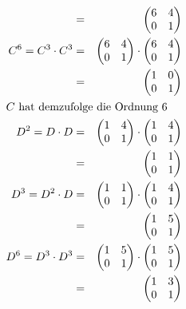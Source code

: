 \documentclass[10pt,a4paper,oneside,ngerman,numbers=noenddot]{scrartcl}
\begin{document}
\begin{alignat*}{2}
&=& \begin{pmatrix} 6 & 4 \\ 0 & 1 \end{pmatrix} \\
C^{6} = C^{3} \cdot C^{3} &=& \begin{pmatrix} 6 & 4 \\ 0 & 1 \end{pmatrix} \cdot \begin{pmatrix} 6 & 4 \\ 0 & 1 \end{pmatrix} \\
&=& \begin{pmatrix} 1 & 0 \\ 0 & 1 \end{pmatrix} \\
\intertext{$C$ hat demzufolge die Ordnung $6$}
D^{2} = D \cdot D &=& \begin{pmatrix} 1 & 4 \\ 0 & 1 \end{pmatrix} \cdot \begin{pmatrix} 1 & 4 \\ 0 & 1 \end{pmatrix} \\
&=& \begin{pmatrix} 1 & 1 \\ 0 & 1 \end{pmatrix} \\
D^{3} = D^{2} \cdot D &=& \begin{pmatrix} 1 & 1 \\ 0 & 1 \end{pmatrix} \cdot \begin{pmatrix} 1 & 4 \\ 0 & 1 \end{pmatrix} \\
&=& \begin{pmatrix} 1 & 5 \\ 0 & 1 \end{pmatrix} \\
D^{6} = D^{3} \cdot D^{3} &=& \begin{pmatrix} 1 & 5 \\ 0 & 1 \end{pmatrix} \cdot \begin{pmatrix} 1 & 5 \\ 0 & 1 \end{pmatrix} \\
&=& \begin{pmatrix} 1 & 3 \\ 0 & 1 \end{pmatrix} \\

\end{alignat*}
\end{document}

